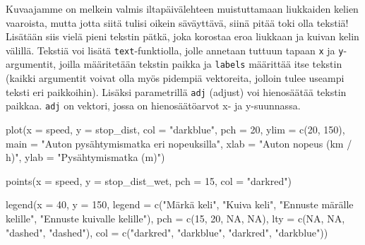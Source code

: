 \documentclass[
]{book}
\newenvironment{Shaded}{\begin{snugshade}}{\end{snugshade}}
\newcommand{\AttributeTok}[1]{\textcolor[rgb]{0.77,0.63,0.00}{#1}}
\newcommand{\ConstantTok}[1]{\textcolor[rgb]{0.00,0.00,0.00}{#1}}
\newcommand{\DecValTok}[1]{\textcolor[rgb]{0.00,0.00,0.81}{#1}}
\newcommand{\FunctionTok}[1]{\textcolor[rgb]{0.00,0.00,0.00}{#1}}
\newcommand{\NormalTok}[1]{#1}
\newcommand{\StringTok}[1]{\textcolor[rgb]{0.31,0.60,0.02}{#1}}
\begin{document}
Kuvaajamme on melkein valmis iltapäivälehteen muistuttamaan liukkaiden kelien vaaroista, mutta jotta siitä tulisi oikein säväyttävä, siinä pitää toki olla tekstiä! Lisätään siis vielä pieni tekstin pätkä, joka korostaa eroa liukkaan ja kuivan kelin välillä. Tekstiä voi lisätä \texttt{text}-funktiolla, jolle annetaan tuttuun tapaan \texttt{x} ja \texttt{y}-argumentit, joilla määritetään tekstin paikka ja \texttt{labels} määrittää itse tekstin (kaikki argumentit voivat olla myös pidempiä vektoreita, jolloin tulee useampi teksti eri paikkoihin). Lisäksi parametrillä \texttt{adj} (adjust) voi hienosäätää tekstin paikkaa. \texttt{adj} on vektori, jossa on hienosäätöarvot x- ja y-suunnassa.

\begin{Shaded}
\begin{Highlighting}[]
\FunctionTok{plot}\NormalTok{(}\AttributeTok{x =}\NormalTok{ speed, }\AttributeTok{y =}\NormalTok{ stop\_dist,}
     \AttributeTok{col =} \StringTok{"darkblue"}\NormalTok{, }\AttributeTok{pch =} \DecValTok{20}\NormalTok{,}
     \AttributeTok{ylim =} \FunctionTok{c}\NormalTok{(}\DecValTok{20}\NormalTok{, }\DecValTok{150}\NormalTok{),}
     \AttributeTok{main =} \StringTok{"Auton pysähtymismatka eri nopeuksilla"}\NormalTok{,}
     \AttributeTok{xlab =} \StringTok{"Auton nopeus (km / h)"}\NormalTok{, }\AttributeTok{ylab =} \StringTok{"Pysähtymismatka (m)"}\NormalTok{)}

\FunctionTok{points}\NormalTok{(}\AttributeTok{x =}\NormalTok{ speed, }\AttributeTok{y =}\NormalTok{ stop\_dist\_wet, }\AttributeTok{pch =} \DecValTok{15}\NormalTok{, }\AttributeTok{col =} \StringTok{"darkred"}\NormalTok{)}

\FunctionTok{legend}\NormalTok{(}\AttributeTok{x =} \DecValTok{40}\NormalTok{, }\AttributeTok{y =} \DecValTok{150}\NormalTok{,}
       \AttributeTok{legend =} \FunctionTok{c}\NormalTok{(}\StringTok{"Märkä keli"}\NormalTok{, }\StringTok{"Kuiva keli"}\NormalTok{,}
                  \StringTok{"Ennuste märälle kelille"}\NormalTok{,}
                  \StringTok{"Ennuste kuivalle kelille"}\NormalTok{),}
       \AttributeTok{pch =} \FunctionTok{c}\NormalTok{(}\DecValTok{15}\NormalTok{, }\DecValTok{20}\NormalTok{, }\ConstantTok{NA}\NormalTok{, }\ConstantTok{NA}\NormalTok{),}
       \AttributeTok{lty =} \FunctionTok{c}\NormalTok{(}\ConstantTok{NA}\NormalTok{, }\ConstantTok{NA}\NormalTok{, }\StringTok{"dashed"}\NormalTok{, }\StringTok{"dashed"}\NormalTok{),}
       \AttributeTok{col =} \FunctionTok{c}\NormalTok{(}\StringTok{"darkred"}\NormalTok{, }\StringTok{"darkblue"}\NormalTok{, }\StringTok{"darkred"}\NormalTok{, }\StringTok{"darkblue"}\NormalTok{))}


\end{Highlighting}
\end{Shaded}
\end{document}
